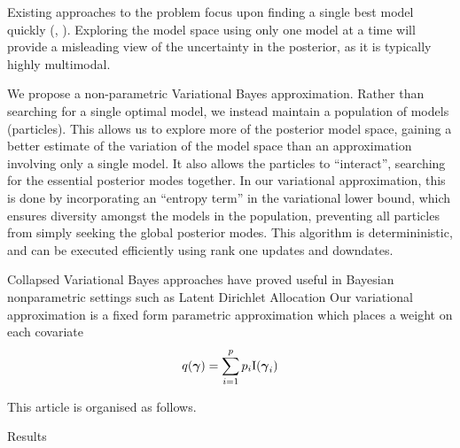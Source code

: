 \documentclass{amsart}[12pt]
\begin{document}
Existing approaches to the problem focus upon finding a single best model quickly (\cite{You2014},
\cite{Rockova2014}). Exploring the model space using only one model at a time will provide a misleading view
of the uncertainty in the posterior, as it is typically highly multimodal.

\cite{Rockova2016}
We propose a non-parametric Variational Bayes approximation. Rather than searching for a single optimal model,
we instead maintain a population of models (particles). This allows us to explore more of the posterior model
space, gaining a better estimate of the variation of the model space than an approximation involving only a
single model. It also allows the particles to ``interact'', searching for the essential posterior modes
together. In our variational approximation, this is done by incorporating an ``entropy term'' in the
variational lower bound, which ensures diversity amongst the models in the population, preventing all
particles from simply seeking the global posterior modes. This algorithm is determininistic, and can be
executed efficiently using rank one updates and downdates.

Collapsed Variational Bayes approaches have proved useful in Bayesian nonparametric settings such as Latent
Dirichlet Allocation \cite{Teh2007}
Our variational approximation is a fixed form parametric approximation which places a weight on each covariate
\[
	q({\boldsymbol \gamma}) = \sum_{i=1}^p p_i \text{I}({\boldsymbol \gamma}_i)
\]


This article is organised as follows.

Results



\end{document}
